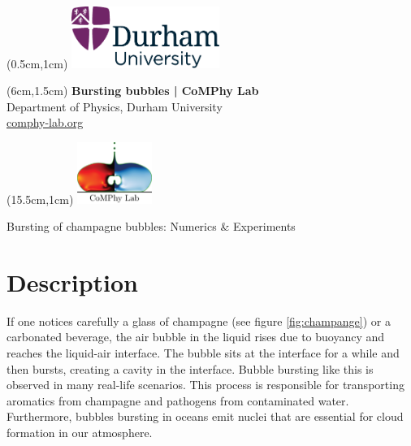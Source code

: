 \documentclass[11pt]{article}
\newlength{\headertobodysep}
\begin{document}
\thispagestyle{empty}

\textblockorigin{0pt}{0pt}

\begin{textblock*}{5cm}(0.5cm,1cm)
    \includegraphics[height=2cm]{../_logosAndRef/Durham-University.pdf}
\end{textblock*}

\begin{textblock*}{9cm}(6cm,1.5cm)
    \centering
    {\large \textbf{Bursting bubbles | CoMPhy Lab}}\\[0.2em]
    Department of Physics, Durham University\\[0.3em]
    \href{https://comphy-lab.org}{comphy-lab.org}
\end{textblock*}

\begin{textblock*}{5cm}(15.5cm,1cm) %
    \includegraphics[height=2cm]{../_logosAndRef/CoMPhy-Lab.png}
\end{textblock*}

\vspace*{\headertobodysep}

\begin{center}
    \begin{LARGE}
     Bursting of champagne bubbles: Numerics \& Experiments
    \end{LARGE}
\end{center}

\section*{Description}
If one notices carefully a glass of champagne (see figure \ref{fig:champange}) or a carbonated beverage, the air bubble in the liquid rises due to buoyancy and reaches the liquid-air interface. The bubble sits at the interface for a while and then bursts, creating a cavity in the interface. Bubble bursting like this is observed in many real-life scenarios. This process is responsible for transporting aromatics from champagne and pathogens from contaminated water. Furthermore, bubbles bursting in oceans emit nuclei that are essential for cloud formation in our atmosphere. 
\end{document}
